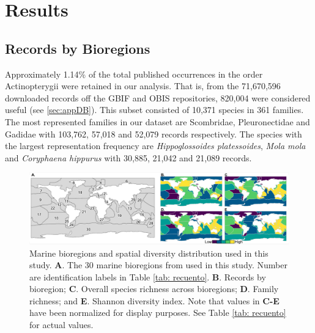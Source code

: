 \documentclass[12pt,authoryear]{elsarticle}
\begin{document}
 \section{Results}

\subsection{Records by Bioregions}
\label{sec:cleaned-data}

Approximately 1.14\% of the total published occurrences in the order Actinopterygii were retained in our analysis. That is, from the 71,670,596 downloaded records off the GBIF and OBIS repositories, 820,004 were considered useful (see \ref{sec:appDB}). This subset consisted of 10,371 species in 361 families. The most represented families in our dataset are Scombridae, Pleuronectidae and Gadidae with 103,762, 57,018 and 52,079 records respectively. The species with the largest representation frequency are \textit{Hippoglossoides platessoides}, \textit{Mola mola} and \textit{Coryphaena hippurus} with 30,885, 21,042 and 21,089 records. 

\begin{figure}
  \centering
  \includegraphics[width=\textwidth]{Fig_1}
   \caption{Marine bioregions and spatial diversity distribution used in this study.  \textsf{ \textbf{A}}. The 30 marine bioregions from \cite{costello2017marine} used in this study. Number are identification labels in Table \ref{tab: recuento}. \textsf{\textbf{B}}. Records by bioregion; \textsf{\textbf{C}}. Overall species richness across bioregions; \textsf{\textbf{D}}. Family richness; and \textsf{\textbf{E}}. Shannon diversity index. Note that values in \textbf{C-E} have been normalized for display purposes. See Table  \ref{tab: recuento} for actual values. }
    \label{fig:Data}
\end{figure}
\end{document}
